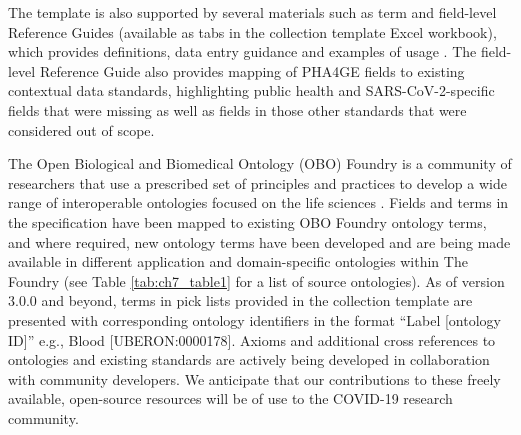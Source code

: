 The template is also supported by several materials such as term and field-level Reference Guides (available as tabs in the collection template Excel workbook), which provides definitions, data entry guidance and examples of usage \cite{public_health_alliance_for_genomic_epidemiology_sars-cov-2-contextual-data-specification_nodate}. The field-level Reference Guide also provides mapping of PHA4GE fields to existing contextual data standards, highlighting public health and SARS-CoV-2-specific fields that were missing as well as fields in those other standards that were considered out of scope. 

The Open Biological and Biomedical Ontology (OBO) Foundry is a community of researchers that use a prescribed set of principles and practices to develop a wide range of interoperable ontologies focused on the life sciences \cite{the_obo_foundry_obo_nodate}. Fields and terms in the specification have been mapped to existing OBO Foundry ontology terms, and where required, new ontology terms have been developed and are being made available in different application and domain-specific ontologies within The Foundry (see Table \ref{tab:ch7_table1} for a list of source ontologies). As of version 3.0.0 and beyond, terms in pick lists provided in the collection template are presented with corresponding ontology identifiers in the format “Label [ontology ID]” e.g., Blood [UBERON:0000178]. Axioms and additional cross references to ontologies and existing standards are actively being developed in collaboration with community developers. We anticipate that our contributions to these freely available, open-source resources will be of use to the COVID-19 research community.

